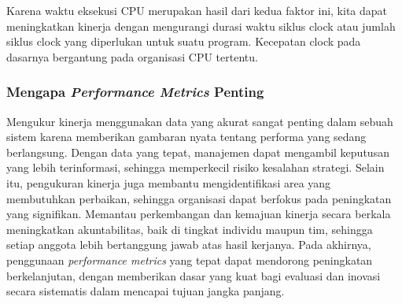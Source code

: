 \documentclass[12pt]{article}
\begin{document}
\hspace*{1cm}Karena waktu eksekusi CPU merupakan hasil dari kedua faktor ini, kita dapat meningkatkan kinerja dengan mengurangi durasi waktu siklus clock atau jumlah siklus clock yang diperlukan untuk suatu program. Kecepatan clock pada dasarnya bergantung pada organisasi CPU tertentu.

\subsubsection{Mengapa \textit{Performance Metrics} Penting}
\hspace*{1cm}Mengukur kinerja menggunakan data yang akurat sangat penting dalam sebuah sistem karena memberikan gambaran nyata tentang performa yang sedang berlangsung. Dengan data yang tepat, manajemen dapat mengambil keputusan yang lebih terinformasi, sehingga memperkecil risiko kesalahan strategi. Selain itu, pengukuran kinerja juga membantu mengidentifikasi area yang membutuhkan perbaikan, sehingga organisasi dapat berfokus pada peningkatan yang signifikan. Memantau perkembangan dan kemajuan kinerja secara berkala meningkatkan akuntabilitas, baik di tingkat individu maupun tim, sehingga setiap anggota lebih bertanggung jawab atas hasil kerjanya. Pada akhirnya, penggunaan  \textit{performance metrics} yang tepat dapat mendorong peningkatan berkelanjutan, dengan memberikan dasar yang kuat bagi evaluasi dan inovasi secara sistematis dalam mencapai tujuan jangka panjang.
\end{document}
